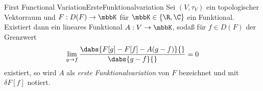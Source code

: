 \begin{mdef}{First Functional Variation}{ErsteFunktionalvariation}
    Sei $(V,\tau_V)$ ein topologischer Vektorraum und $F:D(F)\to \mbbK$ für $\mbbK\in\{\R,\C\}$ ein Funktional. Existiert dann ein lineares Funktional $A:V\to\mbbK$, sodaß für $f\in D(F)$ der Grenzwert
    \[
        \lim_{g\to f}\frac{\dabs{F[g] - F[f] - A(g-f)}{}}{\dabs{g - f}{}} = 0
    \]
    existiert, so wird $A$ als \emph{erste Funktionalvariation} von $F$ bezeichnet und mit $\delta F[f]$ notiert.
\end{mdef}